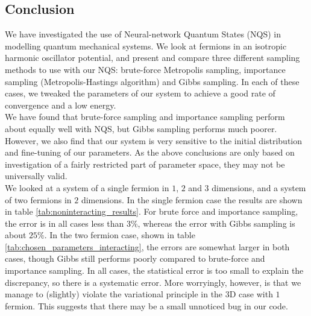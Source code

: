 \documentclass[a4paper, 10pt]{article}
\begin{document}
\subsection{Conclusion}
We have investigated the use of Neural-network Quantum States (NQS) in modelling quantum mechanical systems. We look at fermions in an isotropic harmonic oscillator potential, and present and compare three different sampling methods to use with our NQS: brute-force Metropolis sampling, importance sampling (Metropolis-Hastings algorithm) and Gibbs sampling. In each of these cases, we tweaked the parameters of our system to achieve a good rate of convergence and a low energy.\\
\linebreak
 We have found that brute-force sampling and importance sampling perform about equally well with NQS, but Gibbs sampling performs much poorer. However, we also find that our system is very sensitive to the initial distribution and fine-tuning of our parameters. As the above conclusions are only based on investigation of a fairly restricted part of parameter space, they may not be universally valid.\\
\linebreak
We looked at a system of a single fermion in $1$, $2$ and $3$ dimensions, and a system of two fermions in $2$ dimensions. In the single fermion case the results are shown in table \ref{tab:noninteracting_results}. For brute force and importance sampling, the error is in all cases less than $3\%$, whereas the error with Gibbs sampling is about $25\%$. In the two fermion case, shown in table \ref{tab:chosen_parameters_interacting}, the errors are somewhat larger in both cases, though Gibbs still performs poorly compared to brute-force and importance sampling. In all cases, the statistical error is too small to explain the discrepancy, so there is a systematic error. More worryingly, however, is that we manage to (slightly) violate the variational principle in the 3D case with $1$ fermion. This suggests that there may be a small unnoticed bug in our code.
\end{document}
